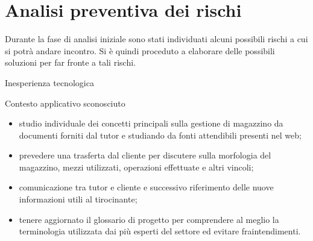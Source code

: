 \section{Analisi preventiva dei rischi}
Durante la fase di analisi iniziale sono stati individuati alcuni possibili rischi a cui si potrà andare incontro.
Si è quindi proceduto a elaborare delle possibili soluzioni per far fronte a tali rischi.\\
\begin{risk}{Inesperienza tecnologica}
    \label{risk:inesperienza-tecnologica} 
\end{risk}
\begin{risk}{Contesto applicativo sconosciuto}
    \begin{itemize}
        \item studio individuale dei concetti principali sulla gestione di magazzino da documenti forniti dal tutor e studiando da fonti attendibili presenti nel web;
        \item prevedere una trasferta dal cliente per discutere sulla morfologia del magazzino, mezzi utilizzati, operazioni effettuate e altri vincoli;
        \item comunicazione tra tutor e cliente e successivo riferimento delle nuove informazioni utili al tirocinante;
        \item tenere aggiornato il glossario di progetto per comprendere al meglio la terminologia utilizzata dai più esperti del settore ed evitare fraintendimenti.
    \end{itemize}
    \label{risk:contesto-applicativo-sconosciuto} 
\end{risk}
